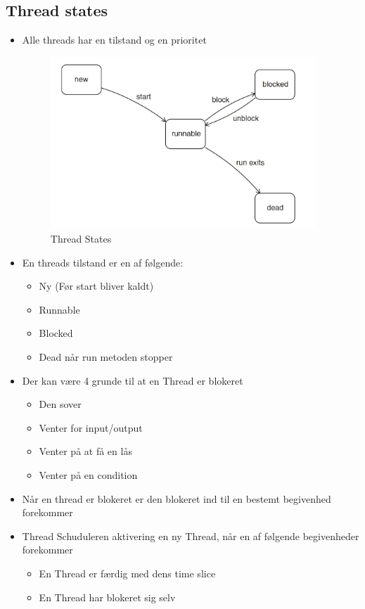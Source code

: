 \documentclass{article}
\begin{document}
\subsection{Thread states}
\begin{itemize}
	\item Alle threads har en tilstand og en prioritet
	\begin{figure}[ht!]
		\centering
		\includegraphics[width=100mm]{img/threadStates.png}
		\caption{Thread States	\label{threadStates}}
	\end{figure}
	\item En threads tilstand er en af følgende:
	\begin{itemize}
		\item Ny (Før start bliver kaldt)
		\item Runnable
		\item Blocked
		\item Dead  når run metoden stopper
	\end{itemize}
	\item Der kan være 4 grunde til at en Thread er blokeret
	\begin{itemize}
		\item Den sover
		\item Venter for input/output
		\item Venter på at få en lås
		\item Venter på en condition
	\end{itemize}
	\item Når en thread er blokeret er den blokeret ind til en bestemt begivenhed forekommer
	\item Thread Schuduleren aktivering en ny Thread, når en af følgende begivenheder forekommer
	\begin{itemize}
		\item En Thread er færdig med dens time slice
		\item En Thread har blokeret sig selv

\end{itemize}
\end{itemize}
\end{document}
